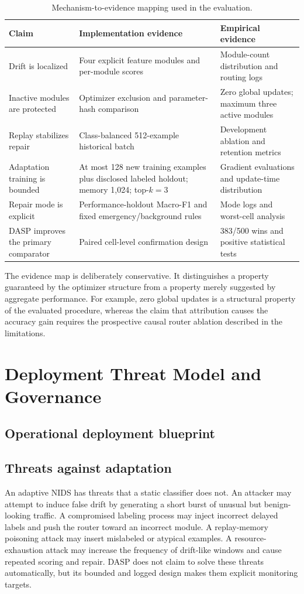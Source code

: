 \begin{table}[t]
\caption{Mechanism-to-evidence mapping used in the evaluation.}
\label{tab:claim-evidence-map}
\centering
\scriptsize
\begin{tabular}{p{}p{}p{}}
\toprule
Claim & Implementation evidence & Empirical evidence\\
\midrule
Drift is localized & Four explicit feature modules and per-module scores & Module-count distribution and routing logs\\
Inactive modules are protected & Optimizer exclusion and parameter-hash comparison & Zero global updates; maximum three active modules\\
Replay stabilizes repair & Class-balanced 512-example historical batch & Development ablation and retention metrics\\
Adaptation training is bounded & At most 128 new training examples plus disclosed labeled holdout; memory 1,024; top-$k=3$ & Gradient evaluations and update-time distribution\\
Repair mode is explicit & Performance-holdout Macro-F1 and fixed emergency/background rules & Mode logs and worst-cell analysis\\
DASP improves the primary comparator & Paired cell-level confirmation design & 383/500 wins and positive statistical tests\\
\bottomrule
\end{tabular}
\end{table}

The evidence map is deliberately conservative. It distinguishes a property guaranteed by the optimizer structure from a property merely suggested by aggregate performance. For example, zero global updates is a structural property of the evaluated procedure, whereas the claim that attribution causes the accuracy gain requires the prospective causal router ablation described in the limitations.

\section{Deployment Threat Model and Governance}
\label{sec:deployment-threat}

\subsection{Operational deployment blueprint}
\subsection{Threats against adaptation}
An adaptive NIDS has threats that a static classifier does not. An attacker may attempt to induce false drift by generating a short burst of unusual but benign-looking traffic. A compromised labeling process may inject incorrect delayed labels and push the router toward an incorrect module. A replay-memory poisoning attack may insert mislabeled or atypical examples. A resource-exhaustion attack may increase the frequency of drift-like windows and cause repeated scoring and repair. DASP does not claim to solve these threats automatically, but its bounded and logged design makes them explicit monitoring targets.

